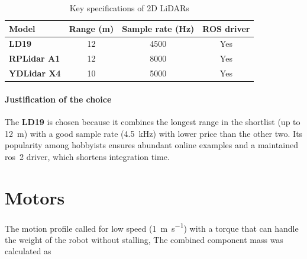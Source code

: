 \begin{table}[H]
  \centering
  \begin{tabular}{l c c c}
    \toprule
    \textbf{Model} &
    \textbf{Range (\si{\metre})} &
    \textbf{Sample rate (\si{\hertz})} &
    \textbf{ROS driver} \\
    \midrule
    \textbf{LD19} & 12 & 4500 & Yes\\
    \textbf{RPLidar A1} & 12 & 8000 & Yes\\
    \textbf{YDLidar X4} & 10 & 5000 & Yes\\
    \bottomrule
  \end{tabular}
  \caption{Key specifications of 2D LiDARs}
  \label{tab:lidar_comparison}
\end{table}

\paragraph*{Justification of the choice}  
The \textbf{LD19} is chosen because it combines the longest range in the shortlist (up to \SI{12}{\metre}) with a good sample rate (\SI{4.5}{\kilo\hertz}) with lower price than the other two. 
Its popularity among hobbyists ensures abundant online examples and a maintained \gls{ros}~2 driver, which shortens integration time. 

\section{Motors}

The motion profile called for low speed (\SI[per-mode=symbol]{1}{\meter\per\second}) with a torque that can handle the weight of the robot without stalling, The combined component mass was calculated as

